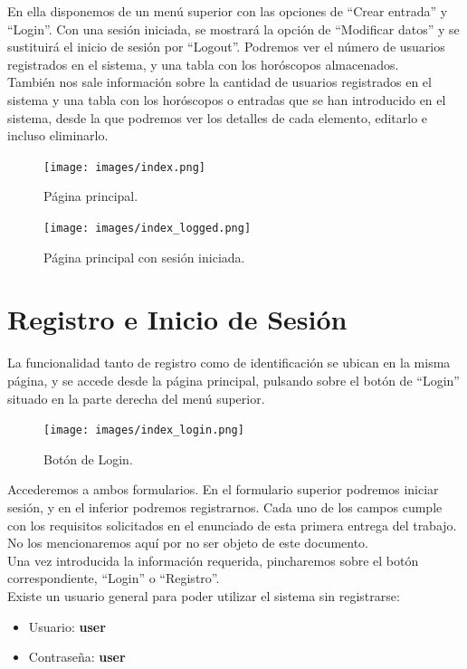 \documentclass[12pt, twoside]{report}
\begin{document}
\newline
En ella disponemos de un menú superior con las opciones de ``Crear entrada'' y ``Login''. Con una sesión iniciada, se mostrará la opción de ``Modificar datos'' y se sustituirá el inicio de sesión por ``Logout''. Podremos ver el número de usuarios registrados en el sistema, y una tabla con los horóscopos almacenados. \\
También nos sale información sobre la cantidad de usuarios registrados en el sistema y una tabla con los horóscopos o entradas que se han introducido en el sistema, desde la que podremos ver los detalles de cada elemento, editarlo e incluso eliminarlo.\\
\begin{figure}[h]
\begin{center}
\texttt{[image: images/index.png]}
\end{center}
\caption{\label{inicio} Página principal.}
\end{figure}
\begin{figure}[h]
\begin{center}
\texttt{[image: images/index\_logged.png]}
\end{center}
\caption{\label{inicio} Página principal con sesión iniciada.}
\end{figure}

\newpage

\section{Registro e Inicio de Sesión}
La funcionalidad tanto de registro como de identificación se ubican en la misma página, y se accede desde la página principal, pulsando sobre el botón de ``Login'' situado en la parte derecha del menú superior.
\begin{figure}[h]
\begin{center}
\texttt{[image: images/index\_login.png]}
\end{center}
\caption{\label{inicio} Botón de Login.}
\end{figure}
\newline
Accederemos a ambos formularios. En el formulario superior podremos iniciar sesión, y en el inferior podremos registrarnos.
Cada uno de los campos cumple con los requisitos solicitados en el enunciado de esta primera entrega del trabajo. No los mencionaremos aquí por no ser objeto de este documento.\\
Una vez introducida la información requerida, pincharemos sobre el botón correspondiente, ``Login'' o ``Registro''.\\
Existe un usuario general para poder utilizar el sistema sin registrarse:
\begin{itemize}
    \item Usuario: \textbf{user}
    \item Contraseña: \textbf{user\\}
\end{itemize}
\end{document}
